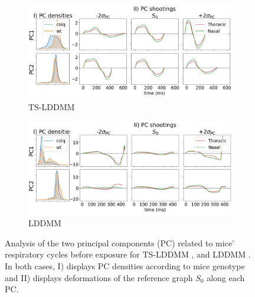 \begin{figure}[t]
  \centering
  \begin{subfigure}[b]{0.49\textwidth}
    \centering
    \includegraphics[width = \textwidth]{pictures/ts_ddmm_shooting.pdf}
    \caption{TS-LDDMM}
    \label{fig:ts-lddmm shooting}
  \end{subfigure}
  \begin{subfigure}[b]{0.49\textwidth}
    \centering
    \includegraphics[width = \textwidth]{pictures/lddmm_shooting.pdf}
    \caption{LDDMM}
    \label{fig:lddmm shooting}
  \end{subfigure}
  \caption{Analysis of the two principal components (PC) related to mice' respiratory cycles before exposure for TS-LDDMM , and LDDMM .
  In both cases, I) displays PC densities according to mice genotype and II) displays  deformations of the reference graph $S_0$ along each PC.}
  \label{fig:exp1}
\end{figure}

